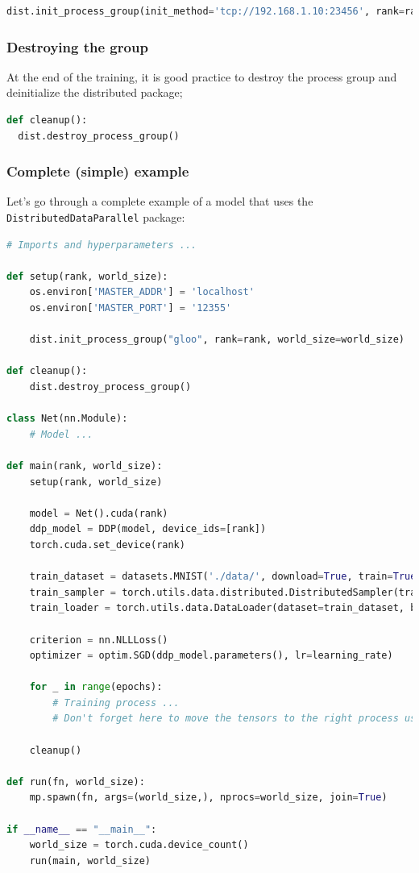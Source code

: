\documentclass{article}
\begin{document}
\begin{lstlisting}[language=Python]
dist.init_process_group(init_method='tcp://192.168.1.10:23456', rank=rank, world_size=size)
\end{lstlisting}

\subsubsection{Destroying the group}
At the end of the training, it is good practice to destroy the process group and deinitialize the distributed package;
\begin{lstlisting}[language=Python]
def cleanup():
  dist.destroy_process_group()
\end{lstlisting}

\subsubsection{Complete (simple) example}
Let's go through a complete example of a model that uses the \lstinline{DistributedDataParallel} package:
\begin{lstlisting}[language=Python]
# Imports and hyperparameters ...

def setup(rank, world_size):
    os.environ['MASTER_ADDR'] = 'localhost'
    os.environ['MASTER_PORT'] = '12355'

    dist.init_process_group("gloo", rank=rank, world_size=world_size)

def cleanup():
    dist.destroy_process_group()

class Net(nn.Module):
    # Model ...

def main(rank, world_size):
    setup(rank, world_size)

    model = Net().cuda(rank)
    ddp_model = DDP(model, device_ids=[rank])
    torch.cuda.set_device(rank)

    train_dataset = datasets.MNIST('./data/', download=True, train=True, transform=transform)
    train_sampler = torch.utils.data.distributed.DistributedSampler(train_dataset, num_replicas=world_size, rank=rank, shuffle=False)
    train_loader = torch.utils.data.DataLoader(dataset=train_dataset, batch_size=batch_size, shuffle=False, pin_memory=True, sampler=train_sampler)

    criterion = nn.NLLLoss()
    optimizer = optim.SGD(ddp_model.parameters(), lr=learning_rate)

    for _ in range(epochs):
        # Training process ...
        # Don't forget here to move the tensors to the right process using the .cuda(rank) method!

    cleanup()

def run(fn, world_size):
    mp.spawn(fn, args=(world_size,), nprocs=world_size, join=True)

if __name__ == "__main__":
    world_size = torch.cuda.device_count()
    run(main, world_size)
\end{lstlisting}
\end{document}
